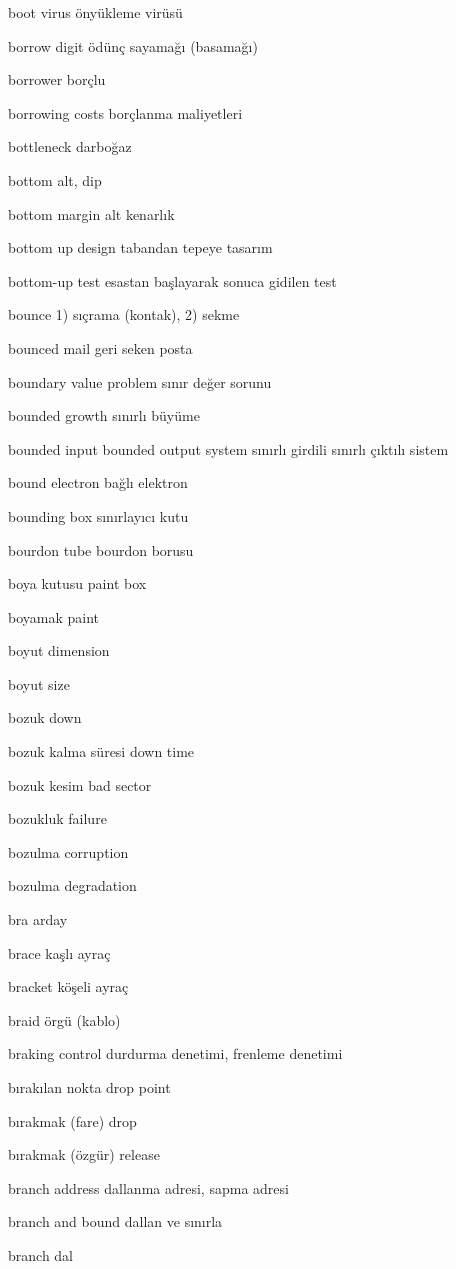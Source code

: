 \documentclass[12pt,fleqn]{article}\usepackage{../../common}
\begin{document}
boot virus önyükleme virüsü

borrow digit ödünç sayamağı (basamağı)

borrower borçlu

borrowing costs borçlanma maliyetleri

bottleneck darboğaz

bottom alt, dip

bottom margin alt kenarlık

bottom up design tabandan tepeye tasarım

bottom-up test esastan başlayarak sonuca gidilen test

bounce 1) sıçrama (kontak), 2) sekme

bounced mail geri seken posta

boundary value problem sınır değer sorunu

bounded growth sınırlı büyüme

bounded input bounded output system sınırlı girdili sınırlı çıktılı sistem

bound electron bağlı elektron

bounding box sınırlayıcı kutu

bourdon tube bourdon borusu

boya kutusu paint box

boyamak paint

boyut dimension

boyut size

bozuk down

bozuk kalma süresi down time

bozuk kesim bad sector

bozukluk failure

bozulma corruption

bozulma degradation

bra arday

brace kaşlı ayraç

bracket köşeli ayraç

braid örgü (kablo)

braking control durdurma denetimi, frenleme denetimi

bırakılan nokta drop point

bırakmak (fare) drop

bırakmak (özgür) release

branch address dallanma adresi, sapma adresi

branch and bound dallan ve sınırla

branch dal
\end{document}
